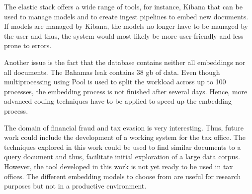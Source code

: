 The elastic stack offers a wide range of tools, for instance, Kibana that can be used to manage models and 
to create ingest pipelines to embed new documents.
If models are managed by Kibana, the models no longer have to be managed by the user and thus, 
the system would most likely be more user-friendly and less prone to errors.

Another issue is the fact that the database contains neither all embeddings nor all documents.
The Bahamas leak contains 38 \ac{gb} of data.
Even though multiprocessing using Pool is used to split the workload across up to 100 processes, 
the embedding process is not finished after several days.
Hence, more advanced coding techniques have to be applied to speed up the embedding process.

The domain of financial fraud and tax evasion is very interesting.
Thus, future work could include the development of a working system for the tax office.
The techniques explored in this work could be used to find similar documents to a query document and thus,
facilitate initial exploration of a large data corpus.
However, the tool developed in this work is not yet ready to be used in tax offices.
The different embedding models to choose from are useful for research purposes but not in a productive environment.